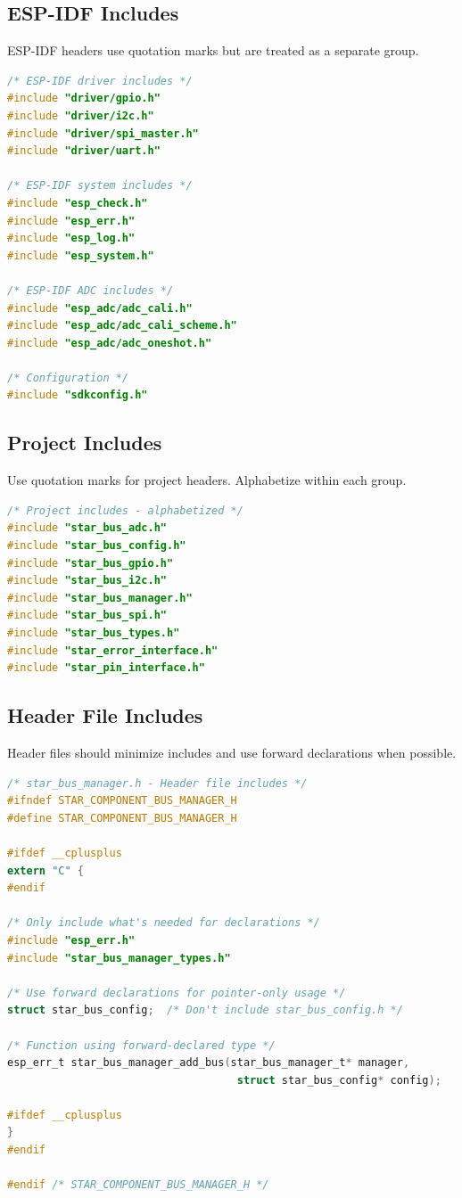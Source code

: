 \subsection{ESP-IDF Includes}

ESP-IDF headers use quotation marks but are treated as a separate group.

\begin{lstlisting}[language=C]
/* ESP-IDF driver includes */
#include "driver/gpio.h"
#include "driver/i2c.h"
#include "driver/spi_master.h"
#include "driver/uart.h"

/* ESP-IDF system includes */
#include "esp_check.h"
#include "esp_err.h"
#include "esp_log.h"
#include "esp_system.h"

/* ESP-IDF ADC includes */
#include "esp_adc/adc_cali.h"
#include "esp_adc/adc_cali_scheme.h"
#include "esp_adc/adc_oneshot.h"

/* Configuration */
#include "sdkconfig.h"
\end{lstlisting}

\subsection{Project Includes}

Use quotation marks for project headers. Alphabetize within each group.

\begin{lstlisting}[language=C]
/* Project includes - alphabetized */
#include "star_bus_adc.h"
#include "star_bus_config.h"
#include "star_bus_gpio.h"
#include "star_bus_i2c.h"
#include "star_bus_manager.h"
#include "star_bus_spi.h"
#include "star_bus_types.h"
#include "star_error_interface.h"
#include "star_pin_interface.h"
\end{lstlisting}

\subsection{Header File Includes}

Header files should minimize includes and use forward declarations when possible.

\begin{lstlisting}[language=C]
/* star_bus_manager.h - Header file includes */
#ifndef STAR_COMPONENT_BUS_MANAGER_H
#define STAR_COMPONENT_BUS_MANAGER_H

#ifdef __cplusplus
extern "C" {
#endif

/* Only include what's needed for declarations */
#include "esp_err.h"
#include "star_bus_manager_types.h"

/* Use forward declarations for pointer-only usage */
struct star_bus_config;  /* Don't include star_bus_config.h */

/* Function using forward-declared type */
esp_err_t star_bus_manager_add_bus(star_bus_manager_t* manager,
                                    struct star_bus_config* config);

#ifdef __cplusplus
}
#endif

#endif /* STAR_COMPONENT_BUS_MANAGER_H */
\end{lstlisting}

